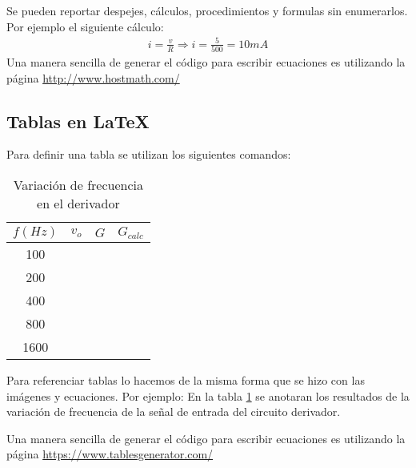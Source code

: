 Se pueden reportar despejes, cálculos, procedimientos y formulas sin enumerarlos. Por ejemplo el siguiente cálculo:
\begin{gather*}
i=\frac{v}{R}\Longrightarrow i=\frac{5}{500}=10 mA
\end{gather*}
Una manera sencilla de generar el código para escribir ecuaciones es utilizando la página \url{http://www.hostmath.com/}
\subsection{Tablas en LaTeX}
Para definir una tabla se utilizan los siguientes comandos:

\begin{table}[h!] \centering
\begin{tabular}{@{}|c|l|l|l|@{}}
\hline
\multicolumn{1}{|l|}{\textbf{$f (Hz)$}} & \textbf{$v_o$} & \textbf{$G$} & \textbf{$G_{calc}$}\\ \hline
100                                                         &             &         &    \\ \hline
200                                                       &             &           &  \\ \hline
400                                                       &             &            & \\ \hline
800                                                       &             &           &  \\ \hline
1600                                                      &             &           &  \\ \hline
\end{tabular}
\caption{Variación de frecuencia en el derivador}
\label{Tab:P2_DERFREQ}
\end{table}   

Para referenciar tablas lo hacemos de la misma forma que se hizo con las imágenes y ecuaciones. Por ejemplo: En la tabla \ref{Tab:P2_DERFREQ} se anotaran los resultados de la variación de frecuencia de la señal de entrada del circuito derivador.

Una manera sencilla de generar el código para escribir ecuaciones es utilizando la página \url{https://www.tablesgenerator.com/}

